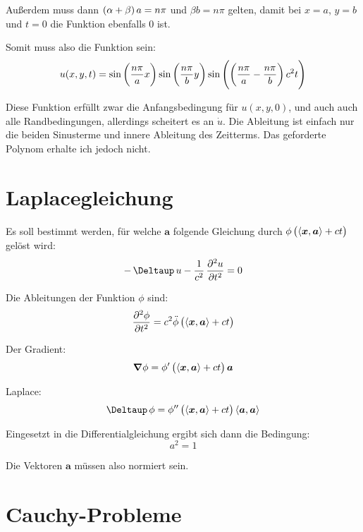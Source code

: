 \documentclass[11pt, ngerman, fleqn]{article}
\newcommand{\inner}[2]{\left\langle #1, #2 \right\rangle}
\newcommand{\laplace}{\mathop{{}\Deltaup}\nolimits}
\newcommand{\vnabla}{\vec \nabla}
\renewcommand{\vec}[1]{\boldsymbol{#1}}
\begin{document}
Außerdem muss dann $\del{\alpha + \beta} a = n \pi$ und $\beta b = n \pi$
gelten, damit bei $x=a$, $y=b$ und $t=0$ die Funktion ebenfalls $0$ ist.

Somit muss also die Funktion sein:
\[
	u(x, y, t)
	= \sin\del{\frac{n\pi}a x}
	\sin\del{\frac{n\pi}b y}
	\sin\del{\del{\frac{n\pi}a - \frac{n\pi}b} c^2 t}
\]

Diese Funktion erfüllt zwar die Anfangsbedingung für $u(x, y, 0)$, und auch
auch alle Randbedingungen, allerdings scheitert es an $\dot u$. Die Ableitung
ist einfach nur die beiden Sinusterme und innere Ableitung des Zeitterms. Das
geforderte Polynom erhalte ich jedoch nicht.


\section{Laplacegleichung}
\label{2}

Es soll bestimmt werden, für welche $\vec a$ folgende Gleichung durch $\phi\del{\inner{\vec x}{\vec a} + ct}$ gelöst wird:
\[
	- \laplace u - \frac1{c^2} \dpd[2] ut = 0
\]

Die Ableitungen der Funktion $\phi$ sind:
\[
	\dpd[2]\phi t = c^2 \ddot \phi\del{\inner{\vec x}{\vec a} + ct}
\]

Der Gradient:
\[
	\vnabla \phi = \phi'\del{\inner{\vec x}{\vec a} + ct} \vec a
\]

Laplace:
\[
	\laplace \phi = \phi''\del{\inner{\vec x}{\vec a} + ct} \inner{\vec a}{\vec a}
\]

Eingesetzt in die Differentialgleichung ergibt sich dann die Bedingung:
\[
	a^2 = 1
\]

Die Vektoren $\vec a$ müssen also normiert sein.


\section{Cauchy-Probleme}
\label{3}
\end{document}

